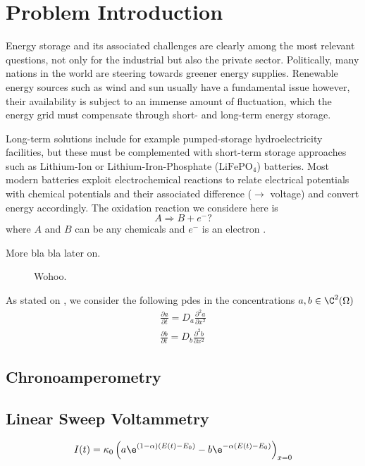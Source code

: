 \documentclass{prettytex/ox/mmsc-special-topic}
\begin{document}
  \pagebreak
  \pagestyle{normal}

  \tableofcontents
  \pagebreak

  \section{Problem Introduction}
  Energy storage and its associated challenges are clearly among the most relevant questions, not only for the industrial but also the private sector.
  Politically, many nations in the world are steering towards greener energy supplies.
  Renewable energy sources such as wind and sun usually have a fundamental issue however, their availability is subject to an immense amount of fluctuation, which the energy grid must compensate through short- and long-term energy storage.

  Long-term solutions include for example pumped-storage hydroelectricity facilities, but these must be complemented with short-term storage approaches such as Lithium-Ion or Lithium-Iron-Phosphate ($\text{LiFePO}_4$) batteries.
  Most modern batteries exploit electrochemical reactions to relate electrical potentials with chemical potentials and their associated difference ($\rightarrow$ voltage) and convert energy accordingly.
  The oxidation reaction we considere here is
  $$A \Rightarrow B + e^-?$$
  where $A$ and $B$ can be any chemicals and $e^-$ is an electron \parencite{Gavaghan2000Jan}.

  More bla bla later on.

  \begin{figure}[H]
    \centering
    \caption{Wohoo.}
    \label{fig:battery-schema}
  \end{figure}

  As stated on , we consider the following \gls{pde}s in the concentrations $a, b \in \C^2(\Omega)$
  \begin{align}
    \label{eq:pde-a} \frac{\partial a}{\partial t} = D_a \frac{\partial^2 a}{\partial x^2} \\
    \label{eq:pde-b} \frac{\partial b}{\partial t} = D_b \frac{\partial^2 b}{\partial x^2}
  \end{align}

  \subsection{Chronoamperometry}
  \subsection{Linear Sweep Voltammetry}
  \begin{equation}
    I(t) = \kappa_0 \left(a \e^{(1-\alpha) (E(t) - E_0)} - b \e^{-\alpha (E(t) - E_0)}\right)_{x=0}
    \label{eq:current}
  \end{equation}
\end{document}
